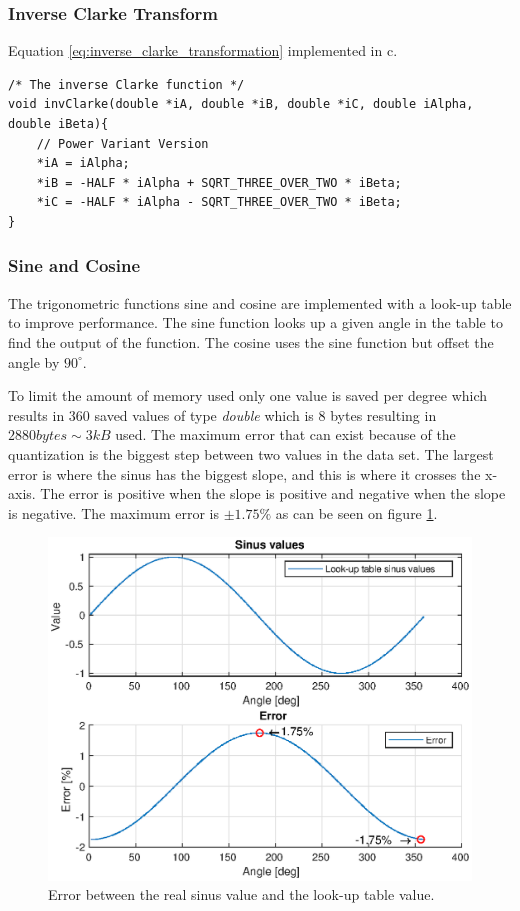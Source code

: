 \subsubsection*{Inverse Clarke Transform}

Equation \ref{eq:inverse_clarke_transformation} implemented in c.

\begin{lstlisting}[style=c, caption=Embedded Inverse Clarke Transformation., label=code:inverse_clarke]
/* The inverse Clarke function */
void invClarke(double *iA, double *iB, double *iC, double iAlpha, double iBeta){
	// Power Variant Version
	*iA = iAlpha;
	*iB = -HALF * iAlpha + SQRT_THREE_OVER_TWO * iBeta;
	*iC = -HALF * iAlpha - SQRT_THREE_OVER_TWO * iBeta;
}
\end{lstlisting}

\subsubsection{Sine and Cosine}
The trigonometric functions sine and cosine are implemented with a look-up table to improve performance. The sine function looks up a given angle in the table to find the output of the function. The cosine uses the sine function but offset the angle by $90 ^{\circ}$. 

To limit the amount of memory used only one value is saved per degree which results in $360$ saved values of type \textit{double} which is $8$ bytes resulting in $2880 bytes \sim 3kB$ used.
The maximum error that can exist because of the quantization is the biggest step between two values in the data set. 
The largest error is where the sinus has the biggest slope, and this is where it crosses the x-axis. The error is positive when the slope is positive and negative when the slope is negative. The maximum error is $\pm 1.75 \%$ as can be seen on figure \ref{fig:sinus_lookup_error}. 
\begin{figure}[H]
	\centering
	\includegraphics[width=0.6 \textwidth]{pictures/software/sinus_lookup_error.eps}
	\caption{Error between the real sinus value and the look-up table value.}
	\label{fig:sinus_lookup_error}
\end{figure}


